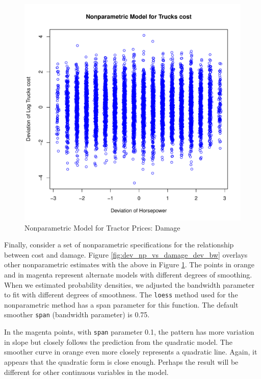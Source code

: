 \documentclass[11pt]{paper}
\begin{document}
\begin{figure}[h!]
  \centering
  \includegraphics[scale = 0.5, keepaspectratio=true]{../Figures/dev_np_vs_damage_dev}
  \caption{Nonparametric Model for Tractor Prices: Damage} \label{fig:dev_np_vs_damage_dev}
\end{figure}

 
\clearpage
Finally, consider a set of nonparametric specifications for 
the relationship between cost and damage.
Figure \ref{fig:dev_np_vs_damage_dev_bw} 
overlays other nonparametric estimates with the above in 
Figure \ref{fig:dev_np_vs_damage_dev}.
The points in orange and in magenta represent
alternate models with different degrees of smoothing. 
%
When we estimated probability densities,
we adjusted the bandwidth parameter to fit
with different degrees of smoothness.
The \texttt{loess} method used for the nonparametric method has a span parameter for this function.
The default smoother \texttt{span} (bandwidth parameter) is 0.75.

In the magenta points, with \texttt{span} parameter 0.1, the pattern has more variation in slope but 
closely follows the prediction from the quadratic model. 
The smoother curve in orange 
even more closely represents a quadratic line. 
Again, it appears that the quadratic form
is close enough.
Perhaps the result will be different for other continuous variables in the model.
\end{document}
